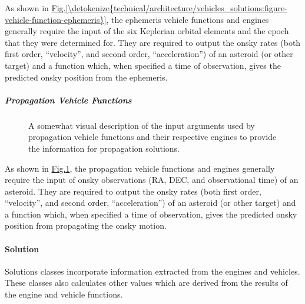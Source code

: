 \documentclass[letterpaper,11pt,english]{sphinxmanual}
\begin{document}
\sphinxAtStartPar
As shown in \hyperref[\detokenize{technical/architecture/vehicles_solutions:figure-vehicle-function-ephemeris}]{Fig.\@ \ref{\detokenize{technical/architecture/vehicles_solutions:figure-vehicle-function-ephemeris}}}, the ephemeris
vehicle functions and engines generally require the input of the six
Keplerian orbital elements and the epoch that they were determined for.
They are required to output the on\sphinxhyphen{}sky rates (both first order, “velocity”,
and second order, “acceleration”) of an asteroid (or other target) and a
function which, when specified a time of observation, gives the predicted
on\sphinxhyphen{}sky position from the ephemeris.


\subparagraph{Propagation Vehicle Functions}
\label{\detokenize{technical/architecture/vehicles_solutions:propagation-vehicle-functions}}
\begin{figure}[H]
\centering
\capstart

\noindent{}
\caption{A somewhat visual description of the input arguments used by
propagation vehicle functions and their respective engines to
provide the information for propagation solutions.}\label{\detokenize{technical/architecture/vehicles_solutions:id5}}\label{\detokenize{technical/architecture/vehicles_solutions:figure-vehicle-function-propagate}}\end{figure}

\sphinxAtStartPar
As shown in \hyperref[\detokenize{technical/architecture/vehicles_solutions:figure-vehicle-function-propagate}]{Fig.\@ \ref{\detokenize{technical/architecture/vehicles_solutions:figure-vehicle-function-propagate}}}, the propagation
vehicle functions and engines generally require the input of on\sphinxhyphen{}sky
observations (RA, DEC, and observational time) of an asteroid. They are
required to output the on\sphinxhyphen{}sky rates (both first order, “velocity”, and
second order, “acceleration”) of an asteroid (or other target) and a function
which, when specified a time of observation, gives the predicted on\sphinxhyphen{}sky
position from propagating the on\sphinxhyphen{}sky motion.


\paragraph{Solution}
\label{\detokenize{technical/architecture/vehicles_solutions:solution}}
\sphinxAtStartPar
Solutions classes incorporate information extracted from the engines and
vehicles. These classes also calculates other values which are derived from
the results of the engine and vehicle functions.
\end{document}
